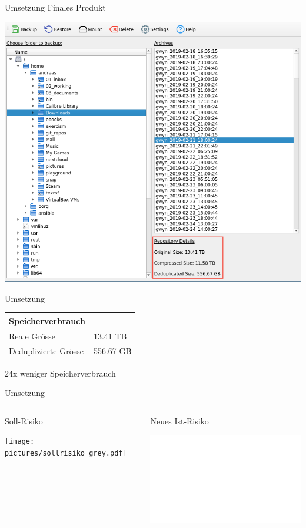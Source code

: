 \documentclass[12pt, aspectratio=1610]{beamer}
\begin{document}
\begin{frame}[label={sec:org637fa6c}]{Umsetzung}
\alert{Finales Produkt}

\begin{center}
\includegraphics[height=.8\textheight]{pictures/borgqt2.png}%
\end{center}
\end{frame}

\begin{frame}[label={sec:org1b99856}]{Umsetzung}
\begin{center}
\begin{tabular}{ll}
\textbf{Speicherverbrauch} & \\
\hline
Reale Grösse & 13.41 TB\\
Deduplizierte Grösse & 556.67 GB\\
\end{tabular}

\end{center}

\begin{center}
24x weniger Speicherverbrauch
\end{center}
\end{frame}

\begin{frame}[label={sec:org5aa0508}]{Umsetzung}
\begin{columns}
\begin{column}{0.45\columnwidth}
\alert{Soll-Risiko}
\begin{center}
\texttt{[image: pictures/sollrisiko\_grey.pdf]}%
\end{center}
\end{column}

\begin{column}{0.45\columnwidth}
\alert{Neues Ist-Risiko}
\begin{center}
\includegraphics<2->[width=\linewidth]{pictures/ist_risiko_neu.pdf}%
\end{center}
\end{column}
\end{columns}
\end{frame}
\end{document}

